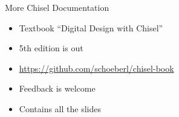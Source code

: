 \begin{frame}[fragile]{More Chisel Documentation}
\begin{itemize}
\item Textbook ``Digital Design with Chisel''
\item 5th edition is out
\item \url{https://github.com/schoeberl/chisel-book}
\item Feedback is welcome
\item Contains all the slides
\end{itemize}
\end{frame}

%

